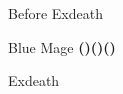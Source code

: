 \begin{paracol}{2}
\switchcolumn
\begin{menu}{Before Exdeath}
    \varwb
    \begin{jobMenu}
        \cara Blue Mage \textbf{(\pointDown)(\pointLeft)(\pointDown)} \ability{\dash} \optimize
    \end{jobMenu}
    \varwe
\end{menu}

\begin{boss}{Exdeath}
    \varwb
    \begin{round}{1}
        \cara \leftCommand{\blue} \then \ltwoOld
        \item {}
        \item {}
        \faris \leftCommand{\blue} \then \lfiveDeath
    \end{round}
    \varwe
\end{boss}

\end{paracol}